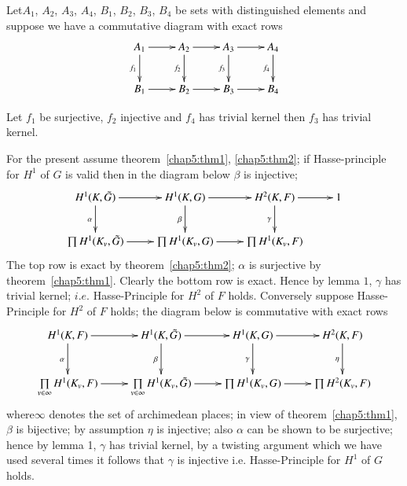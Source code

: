  \setcounter{lem}{0}
 \begin{lem}\label{chap5:sec5.1:lem1}%
Let\pageoriginale $A_1$, $A_2$, $A_3$, $A_4$, $B_1$, $B_2$, $B_3$,
$B_4$ be sets with distinguished elements and suppose we have a
commutative diagram with exact rows  
\[
\xymatrix{
A_1 \ar[r] \ar[d]_{f_1} & A_2 \ar[r]\ar[d]_{f_2} & A_3 \ar[r]
\ar[d]_{f_3} & A_4 \ar[d]_{f_4}\\
B_1 \ar[r] & B_2 \ar[r] & B_3 \ar[r] & B_4 
} 
\]

Let $f_1$ be surjective, $f_2$ injective and $f_4$ has trivial kernel
then $f_3$ has trivial kernel. 
 \end{lem} 
 
 For the present assume theorem~\ref{chap5:thm1}, \ref{chap5:thm2}; if
 Hasse-principle for $H^1$ of 
 $G$ is valid then in the diagram below $\beta$ is injective; 
 \[
\xymatrix{
H^1 (K,\tilde{G}) \ar[r] \ar[d]_\alpha & H^1 (K,G) \ar[r] \ar[d]_\beta & H^2
(K,F) \ar[d]_\gamma \ar[r] & 1 \\
\prod H^1 (K_v, \tilde{G}) \ar[r] & \prod H^1 (K_v, G) \ar[r] & \prod
H^1 (K_v, F)
}
\]
 The top row is exact by theorem~\ref{chap5:thm2}; $\alpha$ is
 surjective by theorem~\ref{chap5:thm1}. 
 Clearly the bottom row is exact. Hence by lemma $1$, $\gamma$ has
 trivial kernel; $i.e$. Hasse-Principle for $H^2$ of $F$
 holds. Conversely suppose Hasse-Principle for $H^2$ of $F$ holds; the
 diagram below is commutative with exact rows  
{\fontsize{10}{12}\selectfont
\[
\xymatrix{
H^1 (K,F) \ar[r] \ar[d]_\alpha & H^1 (K, \tilde{G}) \ar[r]
\ar[d]_\beta & H^1 (K,G) \ar[r] \ar[d]_\gamma & H^2 (K,F)
\ar[d]_{\eta}\\
\prod\limits_{v\in \infty} H^1 (K_v, F) \ar[r] &
\prod\limits_{v\in\infty} H^1 (K_v, \tilde{G}) \ar[r] & \prod H^1
(K_v, G) \ar[r] & \prod H^2 (K_v, F) 
}
\]}
where\pageoriginale $\infty$ denotes the set of archimedean places; in
view of theorem~\ref{chap5:thm1},  $\beta$ is bijective; by assumption
$\eta$ is 
injective; also $\alpha$ can be shown to be surjective; hence by lemma
1, $\gamma$ has trivial kernel, by a twisting argument which we have
used several times it follows that $\gamma$ is injective
i.e. Hasse-Principle for $H^1$ of $G$ holds.  

